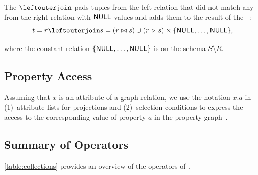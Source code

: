 The \leftouterjointext $\myleftouterjoin$ pads tuples from the left relation that did not match any from the right relation with $\mathsf{NULL}$ values and adds them to the result of the \jointext~\cite{DBLP:books/daglib/0015084}:
$$ t = r \myleftouterjoin s = (r \join s) \union (r \antijoin s) \cartesianproductop \{\relnull, \ldots, \relnull\}, $$

where the constant relation $\{\mathsf{NULL}, \ldots, \mathsf{NULL}\}$ is on the schema $S \setminus R$.

\subsection{Property Access}

Assuming that $x$ is an attribute of a graph relation, we use the notation $x.a$ in (1)~attribute lists for projections and (2)~selection conditions to express the access to the corresponding value of property $a$ in the property graph~\cite{DBLP:conf/edbt/HolschG16}.

\subsection{Summary of Operators}

\autoref{table:collections} provides an overview of the operators of \rga.

\newcommand{\propheader}{\multirow{2}{*}{\bf prop.}}
\newcommand{\rgaheader}{\multirow{2}{*}{\breakable{\bf RGA}}}

